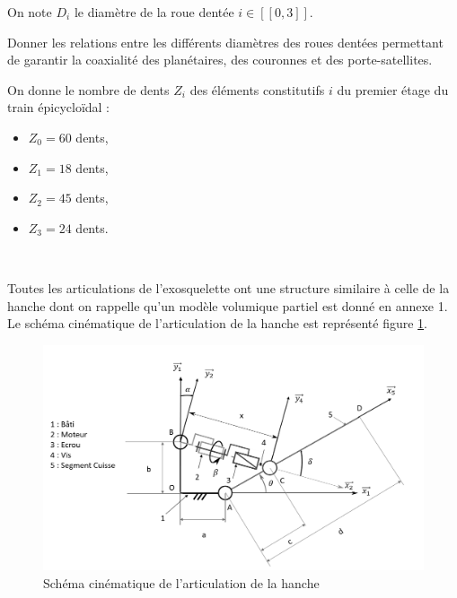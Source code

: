 On note $D_i$ le diamètre de la roue dentée $i\in[\![0,3]\!]$.

Donner les relations entre les différents diamètres des roues dentées permettant de garantir la coaxialité des planétaires, des couronnes et des porte-satellites.

On donne le nombre de dents $Z_i$ des éléments constitutifs $i$ du premier étage du train épicycloïdal :
\begin{itemize}
 \item $Z_0=60$ dents,
 \item $Z_1=18$ dents,
 \item $Z_2=45$ dents,
 \item $Z_3=24$ dents.
\end{itemize}



~\

Toutes les articulations de l'exosquelette ont une structure similaire à celle de la hanche dont on rappelle qu'un modèle volumique partiel est donné en annexe 1. Le schéma cinématique de l'articulation de la hanche est représenté figure \ref{fig14}.

\begin{figure}[ht!]
\begin{center}
 \includegraphics[width=0.9\linewidth]{img/fig14}
\end{center}
\caption{\label{fig14} Schéma cinématique de l'articulation de la hanche}
\end{figure}


